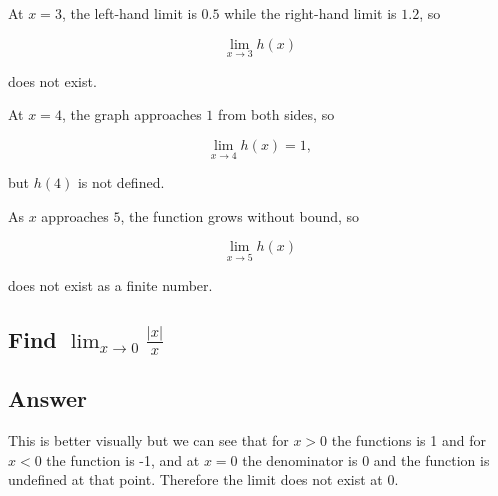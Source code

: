 \documentclass[11pt]{article}
\begin{document}
At $x=3$, the left-hand limit is $0.5$ while the right-hand limit is $1.2$, so

$$
\lim_{x\to 3} h(x)
$$

does not exist.

At $x=4$, the graph approaches $1$ from both sides, so

$$
\lim_{x\to 4} h(x)=1,
$$

but $h(4)$ is not defined.

As $x$ approaches $5$, the function grows without bound, so

$$
\lim_{x\to 5} h(x)
$$

does not exist as a finite number.

\vspace{2em}

\subsection{Find $\displaystyle \lim_{x\to 0} \frac{\left|x\right|}{x}$}

\subsection*{Answer}

This is better visually but we can see that for $x > 0$ the functions is 1 and for $x < 0$ the function is 
-1, and at $x = 0$ the denominator is 0 and the function is undefined at that point. Therefore the limit does 
not exist at 0.

\begin{center}
\end{center}
\end{document}
